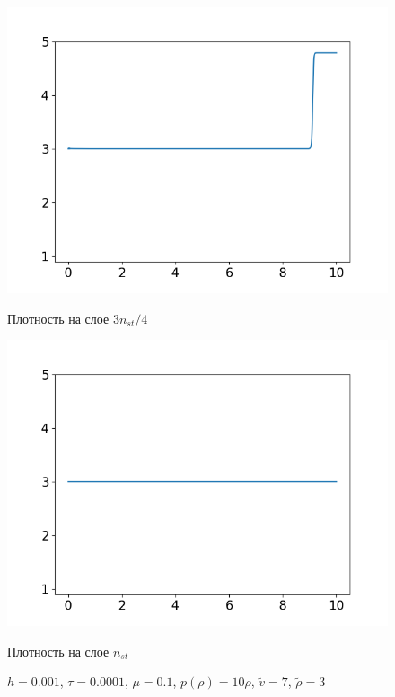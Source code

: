 \begin{figure}[h]
\begin{minipage}[h]{0.47\linewidth}
		\includegraphics[width=1\linewidth]{pics/task4/34h_1.png} 
		\caption{Плотность на слое $3n_{st} / 4$}
	\end{minipage}
	\hfill
	\begin{minipage}[h]{0.47\linewidth}
		\centering
		\includegraphics[width=1\linewidth]{pics/task4/44h_1.png} 
		\caption{Плотность на слое $n_{st}$}
	\end{minipage}
        \caption{$h = 0.001$, $\tau = 0.0001$, $\mu = 0.1$, $p(\rho) = 10\rho$, $\tilde{v} = 7$, $\tilde{\rho} = 3 $}
\end{figure}

